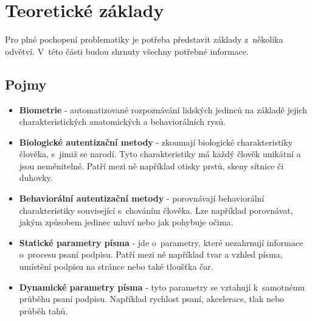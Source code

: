 
\chapter{Teoretické základy}
Pro plné pochopení problematiky je potřeba představit základy z~několika odvětví. 
V~této části budou shrnuty všechny potřebné informace. 

\section{Pojmy}
\label{sec:pojmy}
\begin{itemize}
  \item{\textbf{Biometrie} - automatizované rozpoznávání lidských jedinců na základě jejich charakteristických anatomických a behaviorálních rysů.} %
  \item{\textbf{Biologické autentizační metody} - zkoumají biologické charakteristiky člověka, s~jimiž se narodí. Tyto charakteristiky má každý člověk unikátní a jsou neměnitelné. Patří mezi ně například otisky prstů, skeny sítnice či duhovky.}  
  \item{\textbf{Behaviorální autentizační metody} - porovnávají behaviorální charakteristiky související s~chováním člověka. Lze například porovnávat, jakým způsobem jedinec mluví nebo jak pohybuje očima.}
  \item{\textbf{Statické parametry písma} - jde o~parametry, které nezahrnují informace o~procesu psaní podpisu. Patří mezi ně například tvar a vzhled písma, umístění podpisu na stránce nebo také tloušťka čar.}
  \item{\textbf{Dynamické parametry písma} - tyto parametry se vztahují k~samotnému průběhu psaní podpisu. Například rychlost psaní, akcelerace, tlak nebo průběh tahů.}
\end{itemize}


